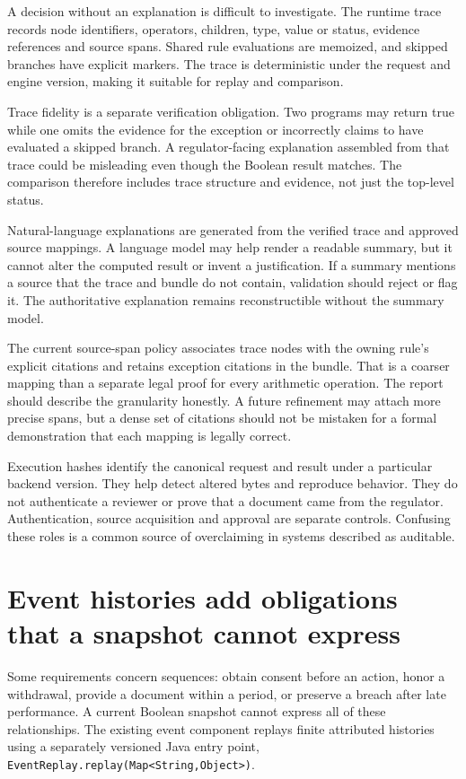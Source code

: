 \documentclass[12pt,a4paper,oneside,openany]{book}
\begin{document}
A decision without an explanation is difficult to investigate. The runtime trace
records node identifiers, operators, children, type, value or status, evidence
references and source spans. Shared rule evaluations are memoized, and skipped
branches have explicit markers. The trace is deterministic under the request and
engine version, making it suitable for replay and comparison.

Trace fidelity is a separate verification obligation. Two programs may return
true while one omits the evidence for the exception or incorrectly claims to have
evaluated a skipped branch. A regulator-facing explanation assembled from that
trace could be misleading even though the Boolean result matches. The comparison
therefore includes trace structure and evidence, not just the top-level status.

Natural-language explanations are generated from the verified trace and approved
source mappings. A language model may help render a readable summary, but it
cannot alter the computed result or invent a justification. If a summary mentions
a source that the trace and bundle do not contain, validation should reject or
flag it. The authoritative explanation remains reconstructible without the
summary model.

The current source-span policy associates trace nodes with the owning rule's
explicit citations and retains exception citations in the bundle. That is a
coarser mapping than a separate legal proof for every arithmetic operation. The
report should describe the granularity honestly. A future refinement may attach
more precise spans, but a dense set of citations should not be mistaken for a
formal demonstration that each mapping is legally correct.

Execution hashes identify the canonical request and result under a particular
backend version. They help detect altered bytes and reproduce behavior. They do
not authenticate a reviewer or prove that a document came from the regulator.
Authentication, source acquisition and approval are separate controls. Confusing
these roles is a common source of overclaiming in systems described as auditable.

\section{Event histories add obligations that a snapshot cannot express}
\label{merge:M07:11}


Some requirements concern sequences: obtain consent before an action, honor a
withdrawal, provide a document within a period, or preserve a breach after late
performance. A current Boolean snapshot cannot express all of these relationships.
The existing event component replays finite attributed histories using a separately
versioned Java entry point, \texttt{EventReplay.replay(Map<String,Object>)}.
\end{document}
